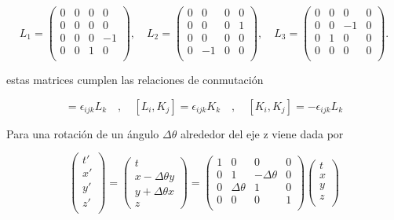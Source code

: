 \[
L_1 = \begin{pmatrix}
0 & 0 & 0 & 0 \\
0 & 0 & 0 & 0 \\
0 & 0 & 0 & -1 \\
0 & 0 & 1 & 0 \\
\end{pmatrix}, \quad
L_2 = \begin{pmatrix}
0 & 0 & 0 & 0 \\
0 & 0 & 0 & 1 \\
0 & 0 & 0 & 0 \\
0 & -1 & 0 & 0 \\
\end{pmatrix}, \quad
L_3 = \begin{pmatrix}
0 & 0 & 0 & 0 \\
0 & 0 & -1 & 0 \\
0 & 1 & 0 & 0 \\
0 & 0 & 0 & 0 \\
\end{pmatrix}.
\]

estas matrices cumplen las relaciones de conmutación

\begin{equation}
    [L_i, L_j] = \epsilon_{ijk}L_k \quad , \quad
    [L_i, K_j] = \epsilon_{ijk}K_k \quad , \quad
    [K_i, K_j] = -\epsilon_{ijk}L_k
\end{equation}

Para una rotación de un ángulo $\Delta \theta$ alrededor del eje z viene dada por

\begin{equation}
    \begin{pmatrix}
        t' \\
        x' \\
        y' \\
        z' \\
    \end{pmatrix} = \begin{pmatrix}
        t \\
        x-\Delta\theta y \\
        y + \Delta\theta x \\
        z
    \end{pmatrix}=\begin{pmatrix}
        1 & 0 & 0 & 0 \\
        0 & 1 & -\Delta\theta & 0 \\
        0 & \Delta\theta & 1 & 0 \\
        0 & 0 & 0 & 1 \\
    \end{pmatrix}\begin{pmatrix}
        t \\
        x \\
        y \\
        z \\
    \end{pmatrix}
\end{equation}

